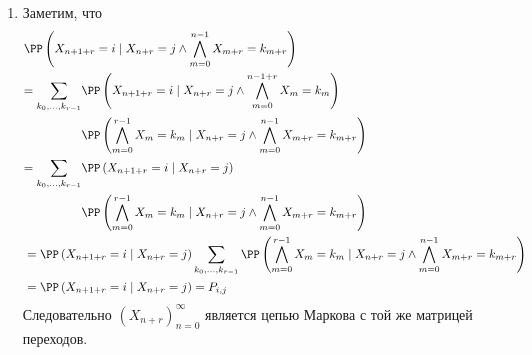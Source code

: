 \documentclass[12pt,a4paper]{article}
\begin{document}
    \begin{enumproblem}\ 
        \begin{enumerate}
            \item Заметим, что
                \begin{align*}
                    &\PP\left(X_{n+1+r} = i \mid X_{n+r} = j \wedge \bigwedge_{m=0}^{n-1} X_{m+r} = k_{m+r}\right)\\
                    &\begin{aligned}
                        = \sum_{k_0, \dots, k_{r-1}} &\PP\left(X_{n+1+r} = i \mid X_{n+r} = j \wedge \bigwedge_{m=0}^{n-1+r} X_{m} = k_{m}\right)\\
                        &\PP\left(\bigwedge_{m=0}^{r-1} X_{m} = k_{m} \mid X_{n+r} = j \wedge \bigwedge_{m=0}^{n-1} X_{m+r} = k_{m+r}\right)
                    \end{aligned}\\
                    &\begin{aligned}
                        = \sum_{k_0, \dots, k_{r-1}} &\PP\left(X_{n+1+r} = i \mid X_{n+r} = j\right)\\
                        &\PP\left(\bigwedge_{m=0}^{r-1} X_{m} = k_{m} \mid X_{n+r} = j \wedge \bigwedge_{m=0}^{n-1} X_{m+r} = k_{m+r}\right)
                    \end{aligned}\\
                    &= \PP\left(X_{n+1+r} = i \mid X_{n+r} = j\right) \sum_{k_0, \dots, k_{r-1}} \PP\left(\bigwedge_{m=0}^{r-1} X_{m} = k_{m} \mid X_{n+r} = j \wedge \bigwedge_{m=0}^{n-1} X_{m+r} = k_{m+r}\right)\\
                    &= \PP\left(X_{n+1+r} = i \mid X_{n+r} = j\right) = P_{i, j}
                \end{align*}
                Следовательно $(X_{n+r})_{n=0}^\infty$ является цепью Маркова с той же матрицей переходов.
            

\end{enumerate}
\end{enumproblem}
\end{document}
